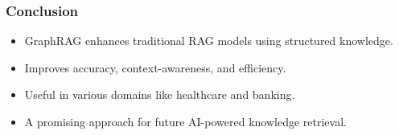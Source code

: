 \begin{frame}[fragile]\frametitle{Conclusion}
    \begin{itemize}
        \item GraphRAG enhances traditional RAG models using structured knowledge.
        \item Improves accuracy, context-awareness, and efficiency.
        \item Useful in various domains like healthcare and banking.
        \item A promising approach for future AI-powered knowledge retrieval.
    \end{itemize}
\end{frame}



